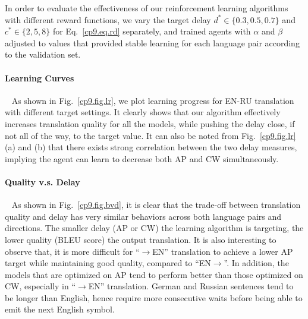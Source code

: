 In order to evaluate the effectiveness of our reinforcement learning algorithms with different reward functions, we vary the target delay $d^* \in \{0.3, 0.5, 0.7\}$ and $c^* \in \{2, 5, 8\}$ for Eq.~\eqref{cp9.eq.rd} separately, and trained agents with $\alpha$ and $\beta$ adjusted to values that provided stable learning for each language pair according to the validation set.

\paragraph{Learning Curves}~ As shown in Fig.~\ref{cp9.fig.lr}, we plot learning progress for EN-RU translation with different target settings. It clearly shows that our algorithm effectively increases translation quality for all the models, while pushing the delay close, if not all of the way, to the target value.
It can also be noted from Fig.~\ref{cp9.fig.lr} (a) and (b) that there exists strong correlation between the two delay measures, implying the agent can learn to decrease both AP and CW simultaneously.

\paragraph{Quality v.s. Delay}~ As shown in Fig.~\ref{cp9.fig.bvd}, it is clear that the trade-off between translation quality and delay has very similar behaviors across both language pairs and directions. The smaller delay (AP or CW) the learning algorithm is targeting, the lower quality (BLEU score) the output translation. It is also interesting to observe that, it is more difficult for ``$\rightarrow$EN'' translation to achieve a lower AP target while maintaining good quality, compared to ``EN$\rightarrow$''. 
In addition, the models that are optimized on AP tend to perform better than those optimized on CW, especially in ``$\rightarrow$EN'' translation. German and Russian sentences tend to be longer than English, hence require more consecutive waits before being able to emit the next English symbol.


